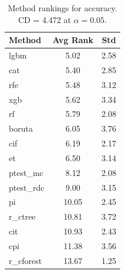 \begin{table}[h]
\centering
\caption{Method rankings for accuracy. CD = 4.472 at $\alpha=0.05$.}
\label{tab:ranks_accuracy}
\begin{tabular}{lcc}
\toprule
Method & Avg Rank & Std \\
\midrule
lgbm & 5.02 & 2.58 \\
cat & 5.40 & 2.85 \\
rfe & 5.48 & 3.12 \\
xgb & 5.62 & 3.34 \\
rf & 5.79 & 2.08 \\
boruta & 6.05 & 3.76 \\
cif & 6.19 & 2.17 \\
et & 6.50 & 3.14 \\
ptest_mc & 8.12 & 2.08 \\
ptest_rdc & 9.00 & 3.15 \\
pi & 10.05 & 2.45 \\
r_ctree & 10.81 & 3.72 \\
cit & 10.93 & 2.43 \\
cpi & 11.38 & 3.56 \\
r_cforest & 13.67 & 1.25 \\
\bottomrule
\end{tabular}
\end{table}